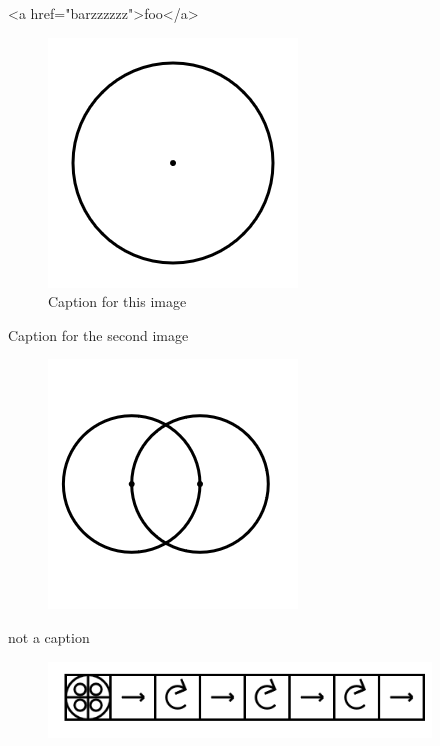 \documentclass[11pt]{article}
\begin{document}
<a href="barzzzzzz">foo</a>




\begin{figure}[h]
\includegraphics{image1.png}

\caption{
Caption for this image}
\end{figure}






Caption for the second image




\begin{figure}[h]
\includegraphics{image3.png}

\caption{}
\end{figure}





not a caption









\begin{figure}[h]
\includegraphics[width=4in]{image5.png}

\caption{}
\end{figure}
\end{document}
